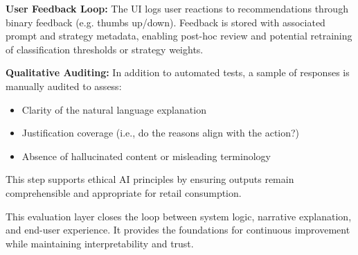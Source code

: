 \textbf{User Feedback Loop:} The UI logs user reactions to recommendations through binary feedback (e.g. thumbs up/down). Feedback is stored with associated prompt and strategy metadata, enabling post-hoc review and potential retraining of classification thresholds or strategy weights.

\textbf{Qualitative Auditing:} In addition to automated tests, a sample of responses is manually audited to assess:
\begin{itemize}
    \item Clarity of the natural language explanation
    \item Justification coverage (i.e., do the reasons align with the action?)
    \item Absence of hallucinated content or misleading terminology
\end{itemize}
This step supports ethical AI principles by ensuring outputs remain comprehensible and appropriate for retail consumption.

This evaluation layer closes the loop between system logic, narrative explanation, and end-user experience. It provides the foundations for continuous improvement while maintaining interpretability and trust.
